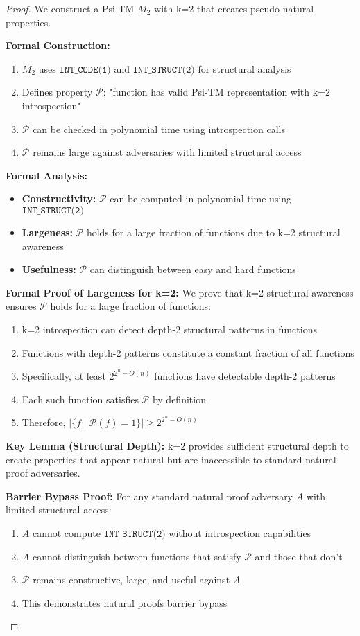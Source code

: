 \documentclass[11pt]{article}
\begin{document}
\begin{proof}
We construct a Psi-TM $M_2$ with k=2 that creates pseudo-natural properties.

\textbf{Formal Construction:}
\begin{enumerate}
\item $M_2$ uses $\texttt{INT\_CODE(1)}$ and $\texttt{INT\_STRUCT(2)}$ for structural analysis
\item Defines property $\mathcal{P}$: "function has valid Psi-TM representation with k=2 introspection"
\item $\mathcal{P}$ can be checked in polynomial time using introspection calls
\item $\mathcal{P}$ remains large against adversaries with limited structural access
\end{enumerate}

\textbf{Formal Analysis:}
\begin{itemize}
\item \textbf{Constructivity:} $\mathcal{P}$ can be computed in polynomial time using $\texttt{INT\_STRUCT(2)}$
\item \textbf{Largeness:} $\mathcal{P}$ holds for a large fraction of functions due to k=2 structural awareness
\item \textbf{Usefulness:} $\mathcal{P}$ can distinguish between easy and hard functions
\end{itemize}

\textbf{Formal Proof of Largeness for k=2:}
We prove that k=2 structural awareness ensures $\mathcal{P}$ holds for a large fraction of functions:
\begin{enumerate}
\item k=2 introspection can detect depth-2 structural patterns in functions
\item Functions with depth-2 patterns constitute a constant fraction of all functions
\item Specifically, at least $2^{2^n - O(n)}$ functions have detectable depth-2 patterns
\item Each such function satisfies $\mathcal{P}$ by definition
\item Therefore, $|\{f \mid \mathcal{P}(f) = 1\}| \geq 2^{2^n - O(n)}$
\end{enumerate}

\textbf{Key Lemma (Structural Depth):} k=2 provides sufficient structural depth to create properties that appear natural but are inaccessible to standard natural proof adversaries.

\textbf{Barrier Bypass Proof:}
For any standard natural proof adversary $A$ with limited structural access:
\begin{enumerate}
\item $A$ cannot compute $\texttt{INT\_STRUCT(2)}$ without introspection capabilities
\item $A$ cannot distinguish between functions that satisfy $\mathcal{P}$ and those that don't
\item $\mathcal{P}$ remains constructive, large, and useful against $A$
\item This demonstrates natural proofs barrier bypass
\end{enumerate}
\end{proof}
\end{document}
